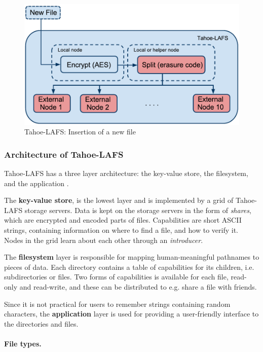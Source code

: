 \documentclass[pdftex,english,10pt,b5paper,twoside]{book}
\begin{document}
\begin{figure}[h!]
    \centering
    \includegraphics[width=\columnwidth]{Tahoe-newfile.pdf}
    \caption{Tahoe-LAFS: Insertion of a new file}
    \label{fig:B:tahoe}
\end{figure}


\subsubsection{Architecture of Tahoe-LAFS}

Tahoe-\ac{LAFS} has a three layer architecture: the key-value store, the filesystem, and
the application \cite{tahoe}.

The \textbf{key-value store}, is the lowest layer and is implemented by a grid
of Tahoe-LAFS storage servers. Data is kept on the storage servers in the form
of \emph{shares}, which are encrypted and encoded parts of files. Capabilities
are short ASCII strings, containing information on where to find a file, and
how to verify it.  Nodes in the grid learn about each other through an
\emph{introducer}.

The \textbf{filesystem} layer is responsible for mapping human-meaningful
pathnames to pieces of data. Each directory contains a table of capabilities
for its children, i.e. subdirectories or files. Two forms of capabilities is
available for each file, read-only and read-write, and these can be distributed
to e.g. share a file with friends.

Since it is not practical for users to remember strings containing random
characters, the \textbf{application} layer is used for providing a user-friendly
interface to the directories and files.

\paragraph{File types.}
\end{document}

